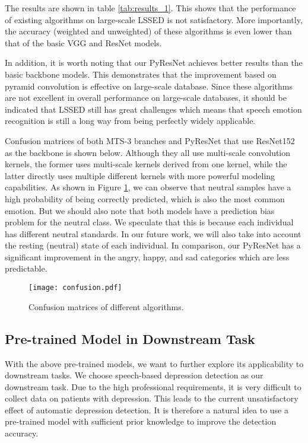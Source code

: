 \documentclass{article}
\begin{document}
The results are shown in table \ref{tab:results_1}.
This shows that the performance of existing algorithms on large-scale LSSED is not satisfactory.
More importantly, the accuracy (weighted and unweighted) of these algorithms is even lower than that of the basic VGG and ResNet models.


In addition, it is worth noting that our PyResNet achieves better results than the basic backbone models. This demonstrates that the improvement based on pyramid convolution is effective on large-scale database.
Since these algorithms are not excellent in overall performance on large-scale databases, it should be indicated that LSSED still has great challenges which means that speech emotion recognition is still a long way from being perfectly widely applicable.

Confusion matrices of both MTS-3 branches and PyResNet that use ResNet152 as the backbone is shown below.
Although they all use multi-scale convolution kernels, the former uses multi-scale kernels derived from one kernel, while the latter directly uses multiple different kernels with more powerful modeling capabilities.
As shown in Figure \ref{fig:confusion}, we can observe that neutral samples have a high probability of being correctly predicted, which is also the most common emotion.
But we should also note that both models have a prediction bias problem  for the neutral class.
We speculate that this is because each individual has different neutral standards.
In our future work, we will also take into account the resting (neutral) state of each individual.
In comparison, our PyResNet has a significant improvement in the angry, happy, and sad categories which are less predictable.


\begin{figure}[htbp]
  \centering
  \texttt{[image: confusion.pdf]}
  \caption{Confusion matrices of different algorithms. }
  \label{fig:confusion}
\end{figure}








\subsection{Pre-trained Model in Downstream Task}
With the above pre-trained models, we want to further explore its applicability to downstream tasks.
We choose speech-based depression detection as our downstream task.
Due to the high professional requirements, it is very difficult to collect data on patients with depression. This leads to the current unsatisfactory effect of automatic depression detection.
It is therefore a natural idea to use a pre-trained model with sufficient prior knowledge to improve the detection accuracy.
\end{document}
